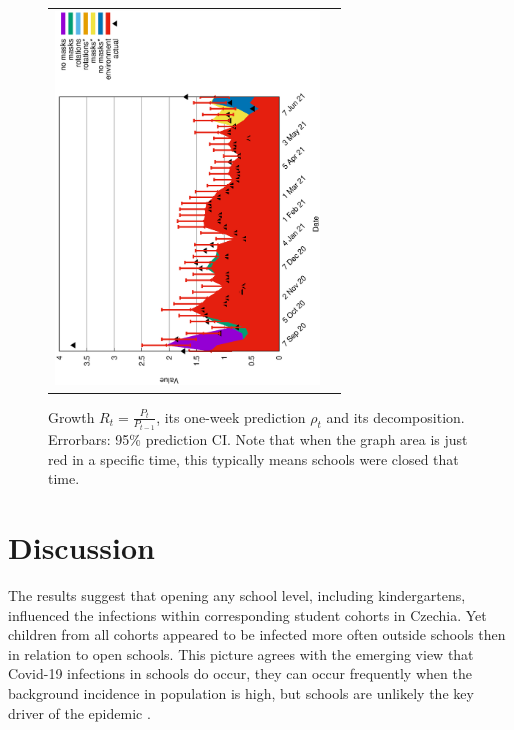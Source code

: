 \documentclass[fleqn,10pt]{wlscirep}
\begin{document}
\begin{figure}
\begin{center}
\begin{tabular}{cc}
\includegraphics[angle=270,width=7cm]{rho4.eps}
\end{tabular}
\caption{Growth $R_t = \frac{P_{t}}{P_{t-1}}$, its one-week prediction $\rho_t$ and its decomposition. Errorbars: 95\% prediction CI. Note that when the graph area is just red in a specific time, this typically means schools were closed that time. }
\label{fig:rho}
\end{center}
\end{figure}


\section*{Discussion}

The results suggest that opening any school level, including kindergartens, influenced the infections within corresponding student cohorts in Czechia. Yet children from all cohorts appeared to be infected more often outside schools then in relation to open schools. This picture agrees with the emerging view that Covid-19 infections in schools do occur, they can occur frequently when the background incidence in population is high, but schools are unlikely the key driver of the epidemic \cite{ecdc2021report, ismail_sars-cov-2_2021, lessler_household_2021, sharma2021understanding, zimmerman_incidence_2021}. 
\end{document}
